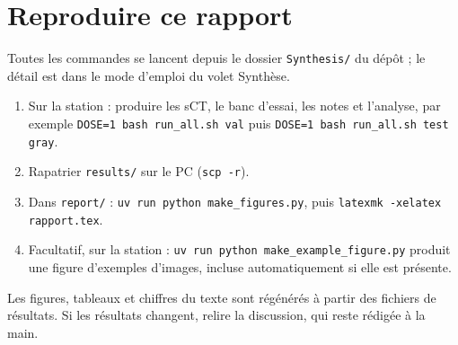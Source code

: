 \documentclass[11pt,a4paper]{article}
\begin{document}
\section{Reproduire ce rapport}
\label{app:repro}
Toutes les commandes se lancent depuis le dossier \texttt{Synthesis/} du dépôt ; le détail est dans le mode d'emploi du volet Synthèse.
\begin{enumerate}
  \item Sur la station : produire les sCT, le banc d'essai, les notes et l'analyse, par exemple \texttt{DOSE=1 bash run\_all.sh val} puis \texttt{DOSE=1 bash run\_all.sh test gray}.
  \item Rapatrier \texttt{results/} sur le PC (\texttt{scp -r}).
  \item Dans \texttt{report/} : \texttt{uv run python make\_figures.py}, puis \texttt{latexmk -xelatex rapport.tex}.
  \item Facultatif, sur la station : \texttt{uv run python make\_example\_figure.py} produit une figure d'exemples d'images, incluse automatiquement si elle est présente.
\end{enumerate}
Les figures, tableaux et chiffres du texte sont régénérés à partir des fichiers de résultats. Si les résultats changent, relire la discussion, qui reste rédigée à la main.
\end{document}

